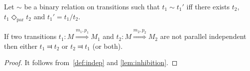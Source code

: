 \begin{definition}
  \label{def:equiv_trans}
  Let $\sim$ be a binary relation on transitions such that $t_1\sim t_1'$ iff there exists $t_2$, $t_1\Diamond_{\text{par}} t_2$ and $t_1' = t_1/t_2$.
\end{definition}


\begin{lemma}
  If two transitions $t_1:M\overset{m_1,p_1}{\Rightarrow} M_1$ and $t_2:M\overset{m_2,p_2}{\Rightarrow} M_2$ are not parallel independent then either $t_1\Dashv t_2$ or $t_2\Dashv t_1$ (or both).
\end{lemma}
\begin{proof}
  It follows from~\autoref{def:indep} and \autoref{lem:inhibition}.
\end{proof}
